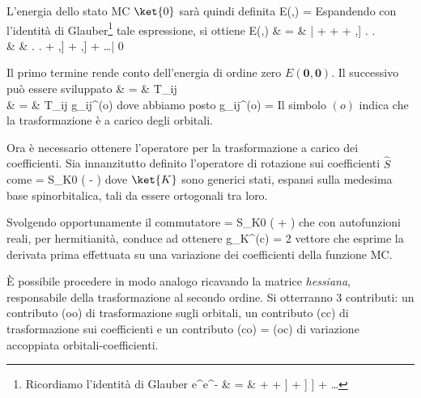 L'energia dello stato MC $\ket{0}$ sar\`a quindi definita
\beq
E(,) =
\eeq
Espandendo con l'identit\`a di Glauber\footnote{Ricordiamo l'identit\`a di Glauber 
\beqas
e^{}e^{-} & = &  +  +  \left[ \hat{A} , \left[ \hat{A} , \hat{B} \right]
\right] +  \left[ \hat{A} , \left[ \hat{A} , \left[ \hat{A} ,
\hat{B} \right] \right] \right] + \ldots
\eeqas
} tale espressione, si ottiene
\beqas
E(,) & = & \left{} \left| \ham +  
+  
+ \half \left[ \left[ \ham,\hat{T}\right],\right] \right. \right. \\
& & \left. \left. + \half \left[ \left[ \ham,\hat{S}\right],\right]
+ \left[ \left[ \ham,\hat{T}\right],\right]
+ \ldots \right| 0 \right\rangle
\eeqas

Il primo termine rende conto dell'energia di ordine zero
$E(\mathbf{0},\mathbf{0})$. Il successivo pu\`o essere sviluppato
\beqas
{} & = &  T_{ij}
 \\
%
& = &  T_{ij} g_{ij}^{(o)}
\eeqas
dove abbiamo posto
\beq
g_{ij}^{(o)} = 
\eeq
Il simbolo $(o)$ indica che la trasformazione \`e a carico degli
orbitali.

Ora \`e necessario ottenere l'operatore per la trasformazione a
carico dei coefficienti. Sia innanzitutto definito l'operatore di rotazione
sui coefficienti $\hat{S}$ come
\beq
{} =  S_{K0} \left( - 
\right)
\eeq
dove $\ket{K}$ sono generici stati, espansi sulla medesima base
spinorbitalica, tali da essere ortogonali tra loro.

Svolgendo opportunamente il commutatore
\beq
{} =
S_{K0} \left(  + 
\right)
\eeq
che con autofunzioni reali, per hermitianit\`a, conduce ad ottenere
\beq
g_K^{(c)} = 2 
\eeq
vettore che esprime la derivata prima effettuata su una
variazione dei coefficienti della funzione MC.

\`E possibile procedere in modo analogo ricavando la matrice
\textit{hessiana}, responsabile della trasformazione al secondo ordine.
Si otterranno 3 contributi: un contributo (oo) di trasformazione sugli 
orbitali, un contributo (cc) di trasformazione sui coefficienti e 
un contributo (co) = (oc) di variazione accoppiata orbitali-coefficienti.

